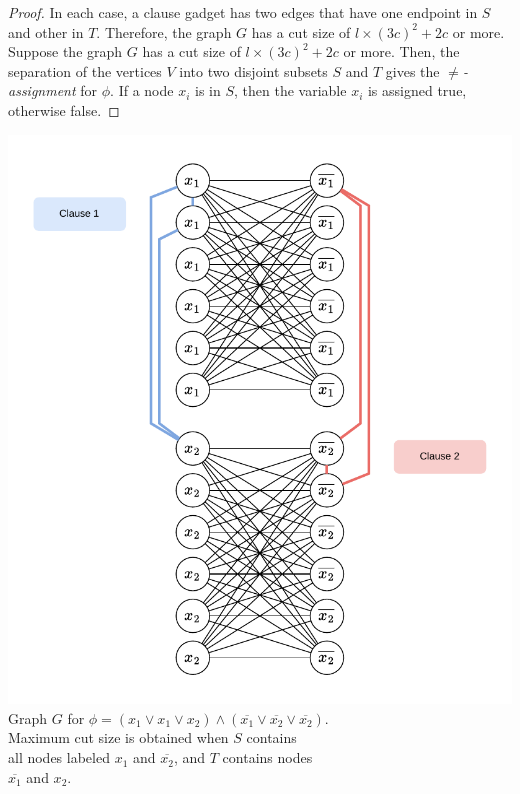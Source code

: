 \documentclass[11pt]{article}
\begin{document}
\begin{proof}
In each case, a clause gadget has two edges that have one endpoint in $S$ and other in $T$. Therefore, the graph $G$ has a cut size of $l \times (3c)^2 + 2c$ or more. \\

Suppose the graph $G$ has a cut size of $l \times (3c)^2 + 2c$ or more. Then, the separation of the vertices $V$ into two disjoint subsets $S$ and $T$ gives the $\neq$\textit{-assignment} for $\phi$. If a node $x_i$ is in $S$, then the variable $x_i$ is assigned true, otherwise false.

\end{proof}

\begin{center}
\includegraphics[scale=1.0]{Figures/Problem7.27a.pdf} \\
Graph $G$ for $\phi = (x_1 \vee x_1 \vee x_2) \wedge (\overline{x_1} \vee \overline{x_2} \vee \overline{x_2})$. \\ Maximum cut size is obtained  when $S$ contains \\ all nodes labeled $x_1$ and $\overline{x_2}$, and $T$ contains nodes \\ $\overline{x_1}$ and $x_2$.
\end{center}
\end{document}
